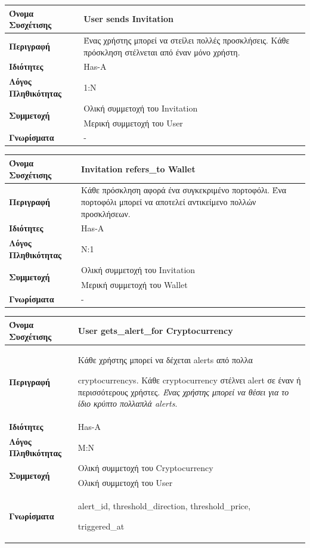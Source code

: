 \vspace{1cm}

\noindent
\begin{tabular}{|p{4cm}|p{10cm}|}
\hline
\textbf{Όνομα Συσχέτισης} & User sends Invitation \\ \hline
\textbf{Περιγραφή} & Ένας χρήστης μπορεί να στείλει πολλές προσκλήσεις. Κάθε πρόσκληση στέλνεται από 
έναν μόνο χρήστη. \\ \hline
\textbf{Ιδιότητες} & Has-A \\ \hline
\textbf{Λόγος Πληθικότητας} & 1:N \\ \hline
\multirow{2}{4cm}{\textbf{Συμμετοχή}}
& Ολική συμμετοχή του Invitation \\ \cline{2-2}
& Μερική συμμετοχή του User \\ \hline
\textbf{Γνωρίσματα} & - \\ \hline
\end{tabular}

\vspace{1cm}

\noindent
\begin{tabular}{|p{4cm}|p{10cm}|}
\hline
\textbf{Όνομα Συσχέτισης} & Invitation refers\_to Wallet \\ \hline
\textbf{Περιγραφή} & Κάθε πρόσκληση αφορά ένα συγκεκριμένο πορτοφόλι. Ένα πορτοφόλι μπορεί να αποτελεί αντικείμενο πολλών προσκλήσεων. \\ \hline
\textbf{Ιδιότητες} & Has-A \\ \hline
\textbf{Λόγος Πληθικότητας} & Ν:1 \\ \hline
\multirow{2}{4cm}{\textbf{Συμμετοχή}} 
& Ολική συμμετοχή του Invitation \\
\cline{2-2}
& Μερική συμμετοχή του Wallet \\
\hline
\textbf{Γνωρίσματα} & - \\ \hline
\end{tabular}

\vspace{1cm}

\noindent
\begin{tabular}{|p{4cm}|p{10cm}|}
\hline
\textbf{Όνομα Συσχέτισης} & User gets\_alert\_for Cryptocurrency \\ \hline
\textbf{Περιγραφή} & Κάθε χρήστης μπορεί να δέχεται alerts από πολλα 

cryptocurrencys. Κάθε cryptocurrency στέλνει alert σε έναν ή περισσότερους χρήστες. \textit{Ένας χρήστης μπορεί να θέσει για το ίδιο κρύπτο πολλαπλά alerts}.\\ \hline
\textbf{Ιδιότητες} & Has-A \\ \hline
\textbf{Λόγος Πληθικότητας} & M:N \\ \hline
\multirow{2}{4cm}{\textbf{Συμμετοχή}}
& Ολική συμμετοχή του Cryptocurrency \\ \cline{2-2}
& Ολική συμμετοχή του User \\ \hline
\textbf{Γνωρίσματα} & alert\_id, threshold\_direction, threshold\_price, 

triggered\_at \\ \hline
\end{tabular}


